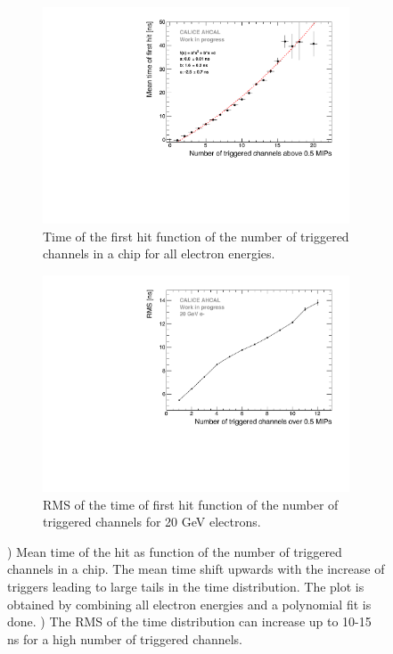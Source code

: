 \begin{figure}[htbp!]
	\begin{subfigure}[t]{0.45\textwidth}
		\centering
		\includegraphics[width=1\textwidth]{chap5/fig_AHCAL_timing/Electrons/NumberHits_Dependance_AllEnergies.pdf}
		\caption{Time of the first hit function of the number of triggered channels in a chip for all electron energies.}\label{fig:nhits_profile}
	\end{subfigure}
	\hfill
	\begin{subfigure}[t]{0.45\textwidth}
		\centering
		\includegraphics[width=1\textwidth]{chap5/fig_AHCAL_timing/Electrons/ParametrisationPedestalShift_20GeV.pdf}
		\caption{RMS of the time of first hit function of the number of triggered channels for 20 GeV electrons.}\label{fig:RMS_nHits}
	\end{subfigure}
	\caption{) Mean time of the hit as function of the number of triggered channels in a chip. The mean time shift upwards with the increase of triggers leading to large tails in the time distribution. The plot is obtained by combining all electron energies and a polynomial fit is done. ) The RMS of the time distribution can increase up to 10-15 ns for a high number of triggered channels.}
\end{figure}

